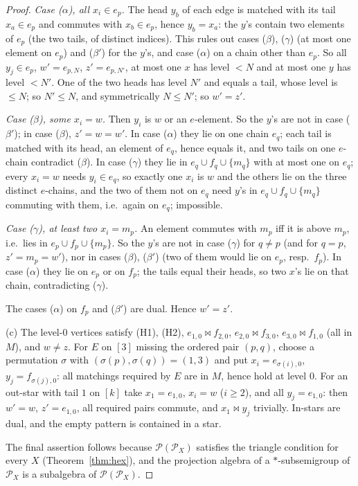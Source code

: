 \documentclass[11pt]{amsart}
\theoremstyle{definition}
\renewcommand{\P}{\mathcal{P}}
\begin{document}
\begin{proof}
\emph{Case ($\alpha$), all $x_i\in e_p$.} The head $y_b$ of each edge is matched with its tail $x_a\in e_p$ and commutes with $x_b\in e_p$, hence $y_b=x_a$: the $y$'s contain two elements of $e_p$ (the two tails, of distinct indices). This rules out cases ($\beta$), ($\gamma$) (at most one element on $e_p$) and ($\beta'$) for the $y$'s, and case ($\alpha$) on a chain other than $e_p$. So all $y_j\in e_p$, $w'=e_{p,N}$, $z'=e_{p,N'}$, at most one $x$ has level $<N$ and at most one $y$ has level $<N'$. One of the two heads has level $N'$ and equals a tail, whose level is $\le N$; so $N'\le N$, and symmetrically $N\le N'$; so $w'=z'$.

\emph{Case ($\beta$), some $x_i=w$.} Then $y_i$ is $w$ or an $e$-element. So the $y$'s are not in case ($\beta'$); in case ($\beta$), $z'=w=w'$. In case ($\alpha$) they lie on one chain $e_q$; each tail is matched with its head, an element of $e_q$, hence equals it, and two tails on one $e$-chain contradict ($\beta$). In case ($\gamma$) they lie in $e_q\cup f_q\cup\{m_q\}$ with at most one on $e_q$; every $x_i=w$ needs $y_i\in e_q$, so exactly one $x_i$ is $w$ and the others lie on the three distinct $e$-chains, and the two of them not on $e_q$ need $y$'s in $e_q\cup f_q\cup\{m_q\}$ commuting with them, i.e.\ again on $e_q$; impossible.

\emph{Case ($\gamma$), at least two $x_i=m_p$.} An element commutes with $m_p$ iff it is above $m_p$, i.e.\ lies in $e_p\cup f_p\cup\{m_p\}$. So the $y$'s are not in case ($\gamma$) for $q\ne p$ (and for $q=p$, $z'=m_p=w'$), nor in cases ($\beta$), ($\beta'$) (two of them would lie on $e_p$, resp.\ $f_p$). In case ($\alpha$) they lie on $e_p$ or on $f_p$; the tails equal their heads, so two $x$'s lie on that chain, contradicting ($\gamma$).

The cases ($\alpha$) on $f_p$ and ($\beta'$) are dual. Hence $w'=z'$.

(c) The level-$0$ vertices satisfy (H1), (H2), $e_{1,0}\bowtie f_{2,0}$, $e_{2,0}\bowtie f_{3,0}$, $e_{3,0}\bowtie f_{1,0}$ (all in $M$), and $w\ne z$. For $E$ on $[3]$ missing the ordered pair $(p,q)$, choose a permutation $\sigma$ with $(\sigma(p),\sigma(q))=(1,3)$ and put $x_i=e_{\sigma(i),0}$, $y_j=f_{\sigma(j),0}$: all matchings required by $E$ are in $M$, hence hold at level $0$. For an out-star with tail $1$ on $[k]$ take $x_1=e_{1,0}$, $x_i=w$ ($i\ge2$), and all $y_j=e_{1,0}$: then $w'=w$, $z'=e_{1,0}$, all required pairs commute, and $x_1\bowtie y_j$ trivially. In-stars are dual, and the empty pattern is contained in a star.

The final assertion follows because $\P(\P_X)$ satisfies the triangle condition for every $X$ (Theorem~\ref{thm:hex}), and the projection algebra of a $*$-subsemigroup of $\P_X$ is a subalgebra of $\P(\P_X)$.
\end{proof}
\end{document}
